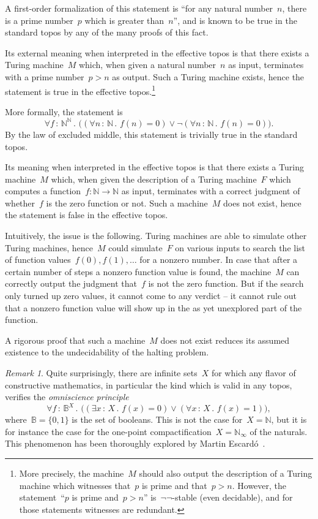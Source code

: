 \documentclass[oneside,reqno]{amsart}
\theoremstyle{definition}
\theoremstyle{plain}
\theoremstyle{remark}
\newtheorem{rem}[defn]{Remark}
\newcommand{\BB}{\mathbb{B}}
\newcommand{\NN}{\mathbb{N}}
\renewcommand{\_}{\mathpunct{.}\,}
\newcommand{\effective}{ef{}fective\xspace}
\newcommand{\?}{\,{:}\,}
\begin{document}
\bigskip
{} A first-order formalization
of this statement is ``for any natural number~$n$, there is a prime
number~$p$ which is greater than~$n$'', and is known to be true in the standard
topos by any of the many proofs of this fact.

Its external meaning when interpreted in the \effective topos is that there exists
a Turing machine~$M$ which, when given a natural number~$n$ as input, terminates with a
prime number~$p > n$ as output. Such a Turing machine exists, hence the
statement is true in the \effective topos.\footnote{More precisely, the
machine~$M$ should also output the description of a Turing machine which
witnesses that~$p$ is prime and that~$p > n$. However, the statement~``$p$ is prime and~$p > n$''
is~$\neg\neg$-stable (even decidable), and for those statements witnesses are
redundant.}


\bigskip
\dotparagraph{``Any function~$\NN \to \NN$ is constantly zero or not.''} More
formally, the statement is
\[ \forall f \? \NN^\NN\_
  \bigl((\forall n \? \NN\_ f(n) = 0) \vee
  \neg
  (\forall n \? \NN\_ f(n) = 0)\bigr). \]
By the law of excluded middle, this statement is trivially true in the standard
topos.

Its meaning when interpreted in the \effective topos is that there exists a
Turing machine~$M$ which, when given the description of a Turing machine~$F$ which
computes a function~$f : \NN \to \NN$ as input, terminates with a correct
judgment of whether~$f$ is the zero function or not. Such a machine~$M$ does
not exist, hence the statement is false in the \effective topos.

Intuitively, the issue
is the following. Turing machines are able to simulate other Turing machines,
hence~$M$ could simulate~$F$ on various inputs to search the list of
function values~$f(0), f(1), \ldots$ for a nonzero number. In case that after
a certain number of steps a nonzero function value is found, the machine~$M$
can correctly output the judgment that~$f$ is not the zero function. But if the
search only turned up zero values, it cannot come to any verdict -- it cannot
rule out that a nonzero function value will show up in the as yet unexplored
part of the function.

A rigorous proof that such a machine~$M$ does not exist reduces its assumed
existence to the undecidability of the halting problem.

\begin{rem}Quite surprisingly, there are infinite sets~$X$ for which any flavor of constructive
mathematics, in particular the kind which is valid in any topos, verifies the
\emph{omniscience principle}
\[ \forall f\?\BB^X\_ \bigl((\exists x\?X\_ f(x) = 0) \vee (\forall x\?X\_ f(x)
= 1)\bigr), \]
where~$\BB = \{ 0, 1 \}$ is the set of booleans. This is not the case for~$X =
\NN$, but it is for instance the case for the one-point compactification~$X =
\NN_\infty$ of the naturals. This phenomenon has been thoroughly explored by
Martin Escardó~\cite{escardo:omniscience}.\end{rem}
\end{document}
